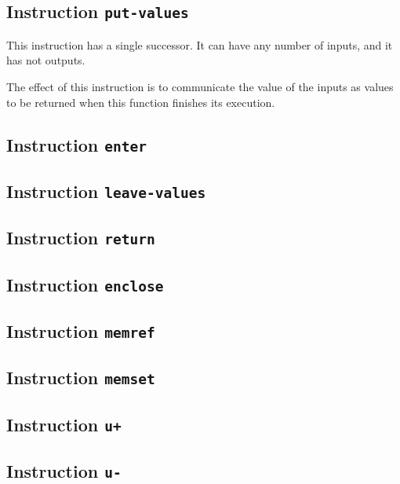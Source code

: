 \subsection{Instruction \texttt{put-values}}
\label{mir-instruction-put-values}

This instruction has a single successor.  It can have any number of
inputs, and it has not outputs. 

The effect of this instruction is to communicate the value of the
inputs as values to be returned when this function finishes its
execution.

\subsection{Instruction \texttt{enter}}
\label{mir-instruction-enter}

\subsection{Instruction \texttt{leave-values}}
\label{mir-instruction-leave-values}

\subsection{Instruction \texttt{return}}
\label{mir-instruction-return}

\subsection{Instruction \texttt{enclose}}
\label{mir-instruction-enclose}

\subsection{Instruction \texttt{memref}}
\label{mir-instruction-memref}

\subsection{Instruction \texttt{memset}}
\label{mir-instruction-memset}

\subsection{Instruction \texttt{u+}}
\label{mir-instruction-u+}

\subsection{Instruction \texttt{u-}}
\label{mir-instruction-u-}


